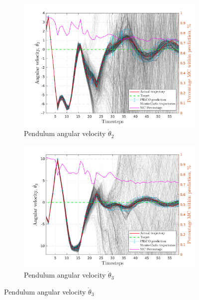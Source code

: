 \begin{figure}[htp!]    
  \begin{subfigure}[b]{0.48\linewidth}
    \centering
    \includegraphics[height=0.22\textheight,width=1\textwidth]{Chapter3/Figures/pen_MC_rollout_Ep_40_Dim_1.png} 
    \caption{Pendulum angular velocity $\dot \theta_{2}$} 
    \label{Fig:Re-pen-cart-position} 
  \end{subfigure} 
  \hspace{\fill}  %
  \begin{subfigure}[b]{0.48\linewidth}
    \centering
    \includegraphics[height=0.22\textheight,width=1\textwidth]{Chapter3/Figures/pen_MC_rollout_Ep_40_Dim_2.png} 
    \caption{Pendulum angular velocity $\dot \theta_{3}$} 
    \label{Fig:Re-pen-cart-velocity} 
  \end{subfigure} 


\end{figure}
